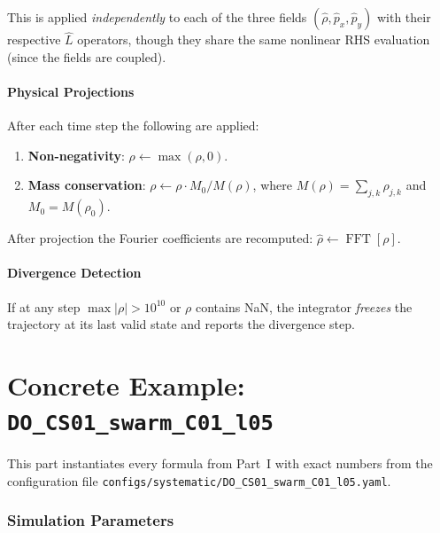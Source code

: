 \documentclass[11pt, letterpaper]{article}
\theoremstyle{definition}
\DeclareMathOperator{\fftn}{FFT}
\begin{document}
This is applied \emph{independently} to each of the three fields
$(\hat\rho, \hat{p}_x, \hat{p}_y)$ with their respective
$\hat{L}$ operators, though they share the same nonlinear RHS
evaluation (since the fields are coupled).

\subsection{Physical Projections}
\label{sec:projections}

After each time step the following are applied:
\begin{enumerate}[nosep]
  \item \textbf{Non-negativity}: $\rho \leftarrow \max(\rho, 0)$.
  \item \textbf{Mass conservation}: $\rho \leftarrow \rho \cdot
    M_0 / M(\rho)$, where $M(\rho) = \sum_{j,k} \rho_{j,k}$ and
    $M_0 = M(\rho_0)$.
\end{enumerate}
After projection the Fourier coefficients are recomputed:
$\hat\rho \leftarrow \fftn[\rho]$.

\subsection{Divergence Detection}
\label{sec:divergence}

If at any step $\max|\rho| > 10^{10}$ or $\rho$ contains NaN, the
integrator \emph{freezes} the trajectory at its last valid state and
reports the divergence step.

\newpage

\part{Concrete Example: \texttt{DO\_CS01\_swarm\_C01\_l05}}
\label{part:concrete}

This part instantiates every formula from Part~I with exact numbers
from the configuration file
\texttt{configs/systematic/DO\_CS01\_swarm\_C01\_l05.yaml}.

\section{Simulation Parameters}
\label{sec:sim-params}
\end{document}

